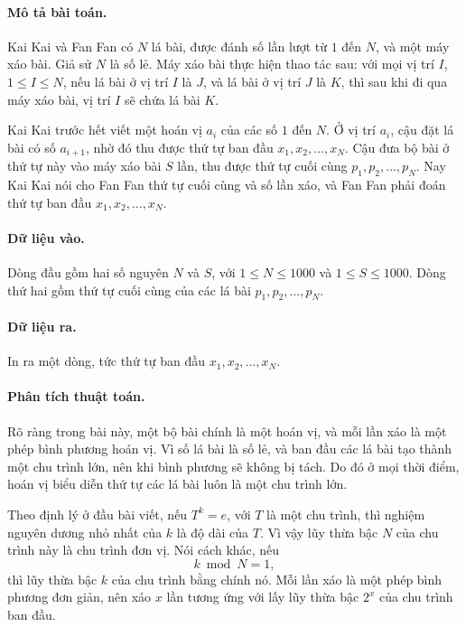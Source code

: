 \documentclass[11pt]{article}
\begin{document}
\paragraph{Mô tả bài toán.}
Kai Kai và Fan Fan có \(N\) lá bài, được đánh số lần lượt từ \(1\) đến \(N\),
và một máy xáo bài. Giả sử \(N\) là số lẻ. Máy xáo bài thực hiện thao tác sau:
với mọi vị trí \(I\), \(1\le I\le N\), nếu lá bài ở vị trí \(I\) là \(J\), và
lá bài ở vị trí \(J\) là \(K\), thì sau khi đi qua máy xáo bài, vị trí \(I\)
sẽ chứa lá bài \(K\).

Kai Kai trước hết viết một hoán vị \(a_i\) của các số \(1\) đến \(N\). Ở vị
trí \(a_i\), cậu đặt lá bài có số \(a_{i+1}\), nhờ đó thu được thứ tự ban đầu
\(x_1,x_2,\ldots,x_N\). Cậu đưa bộ bài ở thứ tự này vào máy xáo bài \(S\) lần,
thu được thứ tự cuối cùng \(p_1,p_2,\ldots,p_N\). Nay Kai Kai nói cho Fan Fan
thứ tự cuối cùng và số lần xáo, và Fan Fan phải đoán thứ tự ban đầu
\(x_1,x_2,\ldots,x_N\).

\paragraph{Dữ liệu vào.}
Dòng đầu gồm hai số nguyên \(N\) và \(S\), với \(1\le N\le 1000\) và
\(1\le S\le 1000\). Dòng thứ hai gồm thứ tự cuối cùng của các lá bài
\(p_1,p_2,\ldots,p_N\).

\paragraph{Dữ liệu ra.}
In ra một dòng, tức thứ tự ban đầu \(x_1,x_2,\ldots,x_N\).

\paragraph{Phân tích thuật toán.}
Rõ ràng trong bài này, một bộ bài chính là một hoán vị, và mỗi lần xáo là một
phép bình phương hoán vị. Vì số lá bài là số lẻ, và ban đầu các lá bài tạo
thành một chu trình lớn, nên khi bình phương sẽ không bị tách. Do đó ở mọi
thời điểm, hoán vị biểu diễn thứ tự các lá bài luôn là một chu trình lớn.

Theo định lý ở đầu bài viết, nếu \(T^k=e\), với \(T\) là một chu trình, thì
nghiệm nguyên dương nhỏ nhất của \(k\) là độ dài của \(T\). Vì vậy lũy thừa
bậc \(N\) của chu trình này là chu trình đơn vị. Nói cách khác, nếu
\[
  k\bmod N=1,
\]
thì lũy thừa bậc \(k\) của chu trình bằng chính nó. Mỗi lần xáo là một phép
bình phương đơn giản, nên xáo \(x\) lần tương ứng với lấy lũy thừa bậc
\(2^x\) của chu trình ban đầu.
\end{document}
